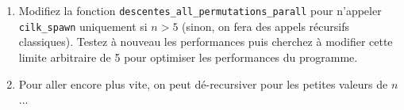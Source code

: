 \documentclass{cours}
\newcommand{\lsti}[1]{\lstinline{#1}{}}
\begin{document}
\begin{exercice}
\begin{enumerate}
\item Modifiez la fonction \lsti{descentes_all_permutations_parall} pour n'appeler \lsti{cilk_spawn} uniquement si $n > 5$ (sinon, on fera des appels récursifs classiques). Testez à nouveau les performances puis cherchez à modifier cette limite arbitraire de 5 pour optimiser les performances du programme.

\item Pour aller encore plus vite, on peut dé-recursiver pour les petites
  valeurs de $n$... 
\end{enumerate}

\end{exercice}
\end{document}
